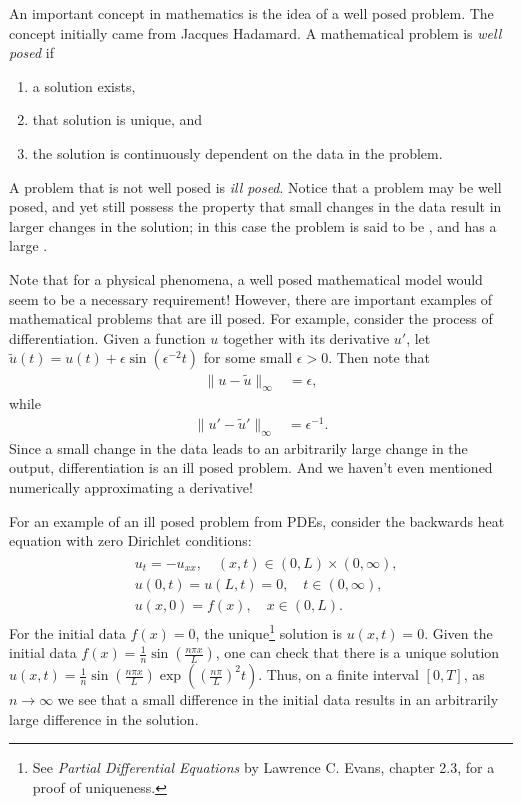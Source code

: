 \label{lab:inverse_problems}

An important concept in mathematics is the idea of a well posed problem.
The concept initially came from Jacques Hadamard.
A mathematical problem is \textit{well posed} if 
\begin{enumerate}
	\item a solution exists, 
	\item that solution is unique, and 
	\item the solution is continuously dependent on the data in the problem.
\label{inverse_problems:continuous_dependence}
\end{enumerate}
A problem that is not well posed is \textit{ill posed}.
Notice that a problem may be well posed, and yet still possess the property that small changes in the data result in larger changes in the solution; in this case the problem is said to be , and has a large .

Note that for a physical phenomena, a well posed mathematical model would seem to be a necessary requirement!
However, there are important examples of mathematical problems that are ill posed.
For example, consider the process of differentiation.
Given a function $u$ together with its derivative $u'$, let $\tilde{u}(t) = u(t) +  \epsilon \sin(\epsilon^{-2}t)$ for some small $\epsilon > 0$.
Then note that 
\begin{align*}
	\|u-\tilde{u}\|_{\infty} &= \epsilon,
\end{align*}
while
\begin{align*}
	\|u'-\tilde{u}'\|_{\infty} &= \epsilon^{-1}.
\end{align*}
Since a small change in the data leads to an arbitrarily large change in the output, differentiation is an ill posed problem.
And we haven't even mentioned numerically approximating a derivative!

For an example of an ill posed problem from PDEs, consider the backwards heat equation with zero Dirichlet conditions: 
\begin{align}
\begin{split}
	&{} u_t = -u_{xx}, \quad (x,t) \in (0,L)\times (0,\infty),\\
	&{} u(0,t) = u(L,t) = 0, \quad t \in (0,\infty),\\
	&{} u(x,0) = f(x), \quad x \in (0,L).
\end{split}
\end{align}
For the initial data $f(x)=0$, the unique\footnote{See \textit{Partial Differential Equations} by Lawrence C. Evans, chapter 2.3, for a proof of uniqueness.} solution is $u(x,t) = 0.$ 
Given the initial data $f(x) = \frac{1}{n}\sin ( \frac{n \pi x}{L})$, one can check that there is a unique solution $u(x,t) = \frac{1}{n}\sin ( \frac{n \pi x}{L})\exp ( (\frac{n \pi }{L})^2 t)$. 
Thus, on a finite interval $[0,T]$, as $n \to \infty$ we see that a small difference in the initial data results in an arbitrarily large difference in the solution.

